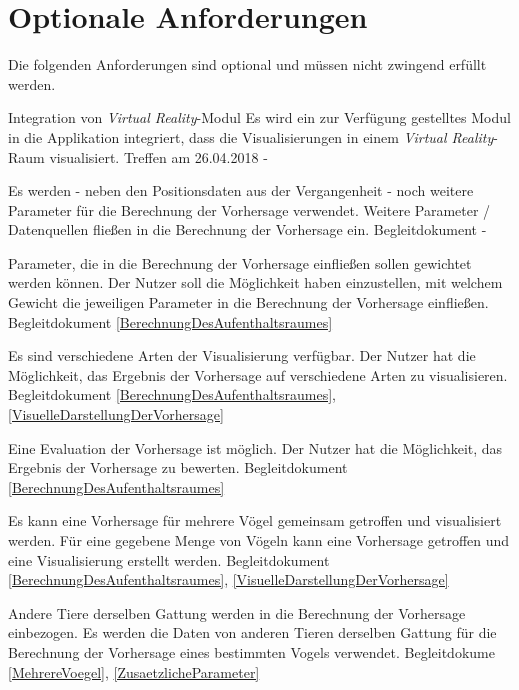 \documentclass[12pt]{article} %
\begin{document}
 \section{Optionale Anforderungen} \label{optionale_anforderungen}

 Die folgenden Anforderungen sind optional und müssen nicht zwingend erfüllt werden.

\begin{requirements}[ref={(O\arabic*)},label=(O\arabic*)]
{
 Integration von \textit{Virtual Reality}-Modul 
 }{
 Es wird ein zur Verfügung gestelltes Modul in die Applikation integriert, dass die Visualisierungen in einem \textit{Virtual Reality}-Raum visualisiert. 
 }{
 Treffen am 26.04.2018 
 }{
 - 
}

{
 Es werden - neben den Positionsdaten aus der Vergangenheit - noch weitere Parameter für die Berechnung der Vorhersage verwendet. 
 }{
 Weitere Parameter / Datenquellen fließen in die Berechnung der Vorhersage ein. 
 }{
 Begleitdokument 
 }{
 - 
}

{
 Parameter, die in die Berechnung der Vorhersage einfließen sollen gewichtet werden können. 
 }{
 Der Nutzer soll die Möglichkeit haben einzustellen, mit welchem Gewicht die jeweiligen Parameter in die Berechnung der Vorhersage einfließen.
 }{
 Begleitdokument 
 }{
 \ref{BerechnungDesAufenthaltsraumes} 
}

{
 Es sind verschiedene Arten der Visualisierung verfügbar. 
 }{
 Der Nutzer hat die Möglichkeit, das Ergebnis der Vorhersage auf verschiedene Arten zu visualisieren. 
 }{
 Begleitdokument 
 }{
 \ref{BerechnungDesAufenthaltsraumes}, \ref{VisuelleDarstellungDerVorhersage} 
}

{
 Eine Evaluation der Vorhersage ist möglich. 
 }{
 Der Nutzer hat die Möglichkeit, das Ergebnis der Vorhersage zu bewerten. 
 }{
 Begleitdokument 
 }{
 \ref{BerechnungDesAufenthaltsraumes} 
}

{
 Es kann eine Vorhersage für mehrere Vögel gemeinsam getroffen und visualisiert werden. 
 }{
 Für eine gegebene Menge von Vögeln kann eine Vorhersage getroffen und eine Visualisierung erstellt werden. 
 }{
 Begleitdokument 
 }{
 \ref{BerechnungDesAufenthaltsraumes}, \ref{VisuelleDarstellungDerVorhersage} 
}

{
 Andere Tiere derselben Gattung werden in die Berechnung der Vorhersage einbezogen. 
 }{
 Es werden die Daten von anderen Tieren derselben Gattung für die Berechnung der Vorhersage eines bestimmten Vogels verwendet. 
 }{
 Begleitdokume
 }{
 \ref{MehrereVoegel}, \ref{ZusaetzlicheParameter} 
}


\end{requirements}
\end{document}
